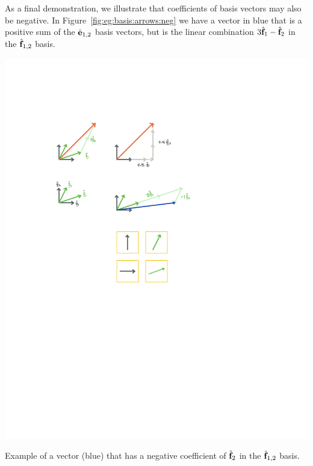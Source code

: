 \documentclass[12pt, oneside]{report}    %
\begin{document}
As a final demonstration, we illustrate that coefficients of basis vectors may also be negative. In Figure~\ref{fig:eg:basis:arrows:neg} we have a vector in blue that is a positive sum of the $\hat{\mathbf{e}}_{1,2}$ basis vectors, but is the linear combination $3\hat{\mathbf{f}}_1 - \hat{\mathbf{f}}_2$ in the $\hat{\mathbf{f}}_{1,2}$ basis.
\begin{marginfigure}%
    \includegraphics[width=\textwidth]{figures/basis_neg.pdf}
    \caption{Example of a vector (blue) that has a negative coefficient of $\hat{\mathbf{f}}_2$ in the $\hat{\mathbf{f}}_{1,2}$ basis.}
    \label{fig:eg:basis:arrows:neg}
\end{marginfigure}
\end{document}

